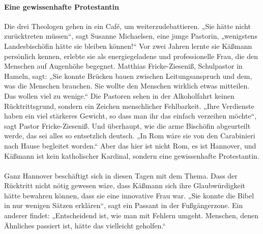 \documentclass[a4paper,12pt,oneside]{scrbook}
\begin{document}
\paragraph{Eine gewissenhafte Protestantin}
Die drei Theologen gehen in ein Café, um weiterzudebattieren. „Sie hätte nicht zurücktreten müssen“, sagt Susanne Michaelsen, eine junge Pastorin, „wenigstens Landesbischöfin hätte sie bleiben können!“ Vor zwei Jahren lernte sie Käßmann persönlich kennen, erlebte sie als energiegeladene und professionelle Frau, die den Menschen auf Augenhöhe begegnet. Matthias Fricke-Zieseniß, Schulpastor in Hameln, sagt: „Sie konnte Brücken bauen zwischen Leitungsanspruch und dem, was die Menschen brauchen. Sie wollte den Menschen wirklich etwas mitteilen. Das wollen viel zu wenige.“ Die Pastoren sehen in der Alkoholfahrt keinen Rücktrittsgrund, sondern ein Zeichen menschlicher Fehlbarkeit. „Ihre Verdienste haben ein viel stärkeres Gewicht, so dass man ihr das einfach verzeihen möchte“, sagt Pastor Fricke-Zieseniß. Und überhaupt, wie die arme Bischöfin abgeurteilt werde, das sei alles so entsetzlich deutsch. „In Rom wäre sie von den Carabinieri nach Hause begleitet worden.“ Aber das hier ist nicht Rom, es ist Hannover, und Käßmann ist kein katholischer Kardinal, sondern eine gewissenhafte Protestantin.
\\\\
Ganz Hannover beschäftigt sich in diesen Tagen mit dem Thema. Dass der Rücktritt nicht nötig gewesen wäre, dass Käßmann sich ihre Glaubwürdigkeit hätte bewahren können, dass sie eine innovative Frau war. „Sie konnte die Bibel in nur wenigen Sätzen erklären“, sagt ein Passant in der Fußgängerzone. Ein anderer findet: „Entscheidend ist, wie man mit Fehlern umgeht. Menschen, denen Ähnliches passiert ist, hätte das vielleicht geholfen.“
\end{document}
